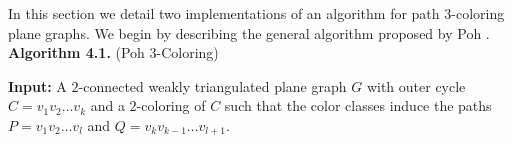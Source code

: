 \documentclass[letterpaper, 12pt]{article}
\theoremstyle{definition}
\theoremstyle{definition}
\theoremstyle{thm}
\theoremstyle{definition}
\begin{document}
\begin{comment}
\begin{proof}
If $|V(G)|\le 3$ there are no vertices to color. Let $|V(G)|>3$ and
suppose the theorem holds for all graphs $H$ with $|V(H)|<|V(G)|$. Let
$P=p_0\ldots p_n$ and $Q=q_0\ldots q_m$ denote the two induced paths from the
$2$-coloring of $C$, ordered such that the edges $p_0q_0$ and $p_nq_m$ are in
$C$. Suppose there exist uncolored vertices, that is $V(G)\setminus V(C)\ne
\emptyset$.

Let $t_0$ be the vertex forming a face with $p_0$ and $q_0$. If
$t_0\in P$, this face is already colored and we consider the graph bounded by
$P-p_0$ and $Q$. Similarly, if $t_0\in Q$ then the inductive hypothesis applies
to the graph bounded by $P$ and $Q-q_0$. Let $t_1$ be the vertex forming a face
with $p_n$ and $q_m$ and proceed in the same manner until $t_1$ is not in either
path.

Suppose there exists an induced path $T$ from $t_0$ to $t_1$. We color
$T$ the remaining color not assigned to $P$ or $Q$ and apply the inductive
hypothesis to the subgraph bounded by $P$ and $T$, and the subgraph bounded by
$T$ and $Q$. With only the path $T$ in common between the two subgraphs, the
combined $3$-coloring forms a path coloring of $G$.

Suppose no such path exists from $t_0$ to $t_1$. Since $G$ is weakly
triangulated there must exist an edge $p_iq_j\in E(G)\setminus E(C)$ with
$p_i\in P$ and $q_j\in Q$. We separately apply the inductive hypothesis to the
subgraph bounded by $p_0\ldots p_i$ and $q_0\ldots q_j$, and the subgraph
bounded by $p_i\ldots p_n$ and $q_j\ldots q_m$. The two subgraphs only share the
vertices $p_i$ and $q_j$, thus the combined $3$-coloring forms a path coloring
of $G$.
\end{proof}
\end{comment}

In this section we detail two implementations of an algorithm for path
$3$-coloring plane graphs. We begin by describing the general algorithm proposed
by Poh \cite{poh}.\\

\noindent\textbf{Algorithm 4.1.} (Poh $3$-Coloring)

\noindent\textbf{Input:} A $2$-connected weakly triangulated plane graph $G$
with outer cycle $C=v_1v_2\ldots v_k$ and a $2$-coloring of $C$ such that the
color classes induce the paths $P=v_1v_2\ldots v_l$ and
$Q=v_{k}v_{k-1}\ldots v_{l+1}$.
\end{document}
